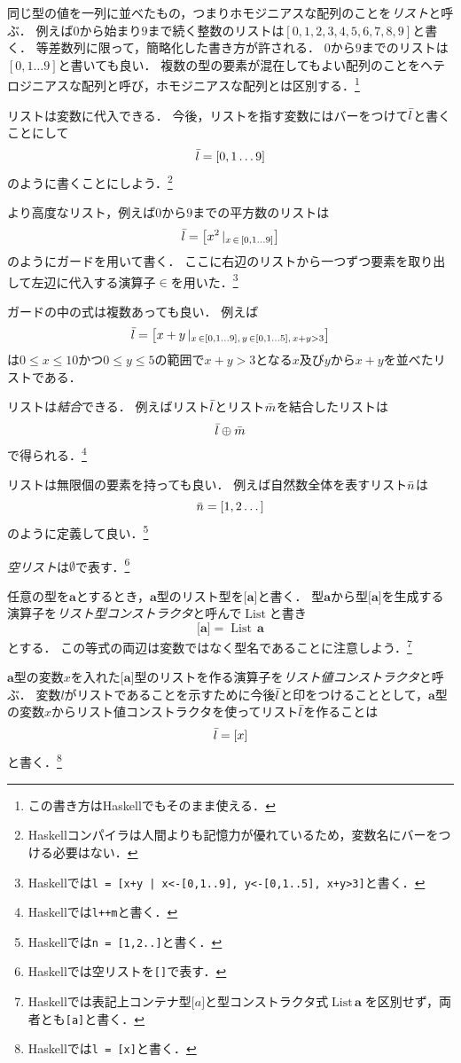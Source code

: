 \documentclass[twocolumn]{jsbook}
\newcommand{\hsklType}[1]{\textbf{#1}}
\newcommand{\hsklTypeConstructor}[1]{\mathop{\mathrm{#1}}}
\DeclareMathOperator{\hsklListConstructor}{\hsklTypeConstructor{List}}
\newcommand{\hsklAppend}{\oplus}
\newcommand{\hsklEmptyList}{\emptyset}
\newcommand{\hsklList}[1]{\Bar{#1}}
\newcommand{\hsklListType}[1]{\boldsymbol{[}#1\boldsymbol{]}}
\newcommand{\hsklTypeConstruct}[2]{#1\,#2}
\DeclareMathOperator{\mathFrom}{\in}
\newcommand{\mathGuard}[1]{\mathop{\mid_{#1}}}
\newcommand{\keyword}[1]{\emph{#1}}
\newcommand{\code}[1]{\texttt{#1}}
\begin{document}
同じ型の値を一列に並べたもの，つまりホモジニアスな配列のことを\keyword{リスト}と呼ぶ．
例えば$0$から始まり$9$まで続く整数のリストは$[0,1,2,3,4,5,6,7,8,9]$と書く．
等差数列に限って，簡略化した書き方が許される．
$0$から$9$までのリストは$[0,1\dots9]$と書いても良い．
複数の型の要素が混在してもよい配列のことをヘテロジニアスな配列と呼び，ホモジニアスな配列とは区別する．\footnote{この書き方はHaskellでもそのまま使える．}

リストは変数に代入できる．
今後，リストを指す変数にはバーをつけて$\hsklList{l}$と書くことにして$$\hsklList{l}=[0,1\dots9]$$のように書くことにしよう．\footnote{Haskellコンパイラは人間よりも記憶力が優れているため，変数名にバーをつける必要はない．}

より高度なリスト，例えば$0$から$9$までの平方数のリストは$$\hsklList{l}=\left[x^2\mathGuard{x\mathFrom{[0,1\dots9]}}\right]$$のようにガードを用いて書く．
ここに右辺のリストから一つずつ要素を取り出して左辺に代入する演算子$\mathFrom$を用いた．\footnote{Haskellでは\code{l = [x+y | x<-[0,1..9], y<-[0,1..5], x+y>3]}と書く．}

ガードの中の式は複数あっても良い．
例えば$$\hsklList{l}=\left[x+y\mathGuard{x\mathFrom[0,1\dots9],\,y\mathFrom[0,1\dots5],\,x+y>3}\right]$$は$0\le x\le 10$かつ$0\le y\le 5$の範囲で$x+y>3$となる$x$及び$y$から$x+y$を並べたリストである．

リストは\keyword{結合}できる．
例えばリスト$\hsklList{l}$とリスト$\hsklList{m}$を結合したリストは$$\hsklList{l}\hsklAppend\hsklList{m}$$で得られる．\footnote{Haskellでは\code{l++m}と書く．}

リストは無限個の要素を持っても良い．
例えば自然数全体を表すリスト$\hsklList{n}$は$$\hsklList{n}=[1,2\dots]$$のように定義して良い．\footnote{Haskellでは\code{n = [1,2..]}と書く．}

\keyword{空リスト}は$\hsklEmptyList$で表す．\footnote{Haskellでは空リストを\code{[]}で表す．}

任意の型を$\hsklType{a}$とするとき，$\hsklType{a}$型のリスト型を$\hsklListType{\hsklType{a}}$と書く．
型$\hsklType{a}$から型$\hsklListType{\hsklType{a}}$を生成する演算子を\keyword{リスト型コンストラクタ}と呼んで$\hsklListConstructor$と書き$$\hsklListType{\hsklType{a}}=\hsklTypeConstruct{\hsklListConstructor}{\hsklType{a}}$$とする．
この等式の両辺は変数ではなく型名であることに注意しよう．\footnote{Haskellでは表記上コンテナ型$\hsklListType{a}$と型コンストラクタ式$\hsklTypeConstruct{\hsklListConstructor}{\hsklType{a}}$を区別せず，両者とも\code{[a]}と書く．}

$\hsklType{a}$型の変数$x$を入れた$\hsklListType{\hsklType{a}}$型のリストを作る演算子を\keyword{リスト値コンストラクタ}と呼ぶ．
変数$l$がリストであることを示すために今後$\hsklList{l}$と印をつけることとして，$\hsklType{a}$型の変数$x$からリスト値コンストラクタを使ってリスト$\hsklList{l}$を作ることは$$\hsklList{l}=[x]$$と書く．\footnote{Haskellでは\code{l = [x]}と書く．}
\end{document}
